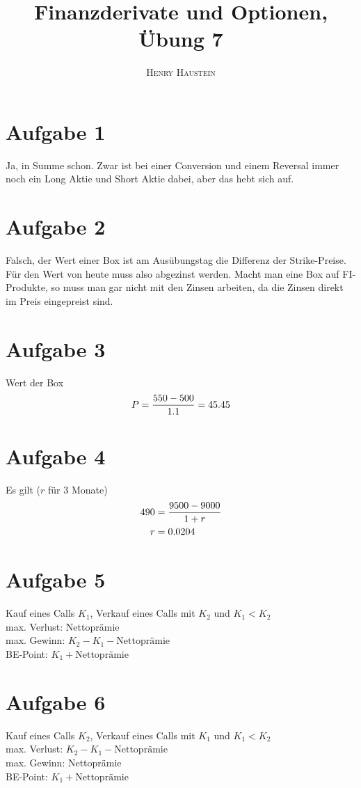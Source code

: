 \documentclass{article}
\title{\textbf{Finanzderivate und Optionen, Übung 7}}
\author{\textsc{Henry Haustein}}
\date{}
\begin{document}
	\maketitle
	
	\section*{Aufgabe 1}
	Ja, in Summe schon. Zwar ist bei einer Conversion und einem Reversal immer noch ein Long Aktie und Short Aktie dabei, aber das hebt sich auf.

	\section*{Aufgabe 2}
	Falsch, der Wert einer Box ist am Ausübungstag die Differenz der Strike-Preise. Für den Wert von heute muss also abgezinst werden. Macht man eine Box auf FI-Produkte, so muss man gar nicht mit den Zinsen arbeiten, da die Zinsen direkt im Preis eingepreist sind.
	
	\section*{Aufgabe 3}
	Wert der Box
	\begin{align}
		P = \frac{550-500}{1.1} = 45.45 \notag
	\end{align}
	
	\section*{Aufgabe 4}
	Es gilt ($r$ für 3 Monate)
	\begin{align}
		490 &= \frac{9500-9000}{1 + r} \notag \\
		r &= 0.0204 \notag
	\end{align}
	
	\section*{Aufgabe 5}
	Kauf eines Calls $K_1$, Verkauf eines Calls mit $K_2$ und $K_1 < K_2$ \\
	max. Verlust: Nettoprämie \\
	max. Gewinn: $K_2 - K_1 - \text{Nettoprämie}$ \\
	BE-Point: $K_1 + \text{Nettoprämie}$
	
	\section*{Aufgabe 6}
	Kauf eines Calls $K_2$, Verkauf eines Calls mit $K_1$ und $K_1 < K_2$ \\
	max. Verlust: $K_2 - K_1 - \text{Nettoprämie}$ \\
	max. Gewinn: Nettoprämie \\
	BE-Point: $K_1 + \text{Nettoprämie}$
	
\end{document}
